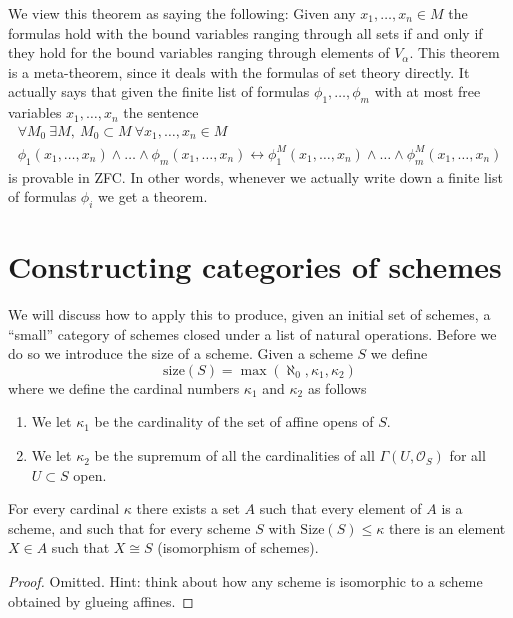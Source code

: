 \noindent
We view this theorem as saying the following: Given any
$x_1, \ldots, x_n \in M$ the formulas hold with the bound variables ranging
through all sets if and only if they hold for the bound variables ranging
through elements of $V_\alpha$. This theorem is a meta-theorem, since
it deals with the formulas of set theory directly.
It actually says that given the finite list of formulas
$\phi_1, \ldots, \phi_m$ with at most free variables $x_1, \ldots, x_n$
the sentence
$$
\begin{matrix}
\forall M_0\ \exists M,\ M_0 \subset M\ \forall x_1, \ldots, x_n \in M \\
\phi_1(x_1,\ldots,x_n) \wedge \ldots \wedge \phi_m(x_1,\ldots,x_n)
\leftrightarrow
\phi_1^M(x_1,\ldots,x_n) \wedge \ldots \wedge \phi_m^M(x_1,\ldots,x_n)
\end{matrix}
$$
is provable in ZFC. In other words, whenever we actually write down
a finite list of formulas $\phi_i$ we get a theorem.

\section{Constructing categories of schemes}
\label{section-fibre-product-schemes}

\noindent
We will discuss how to apply this to produce, given an initial
set of schemes, a ``small'' category of schemes closed under
a list of natural operations. Before we do so we introduce the
size of a scheme. Given a scheme $S$ we define
$$
\text{size}(S) = \max(\aleph_0, \kappa_1, \kappa_2)
$$
where we define the cardinal numbers $\kappa_1$ and $\kappa_2$ as follows
\begin{enumerate}
\item We let $\kappa_1$ be the cardinality of the set of affine opens of $S$.
\item We let $\kappa_2$ be the supremum of all the cardinalities of
all $\Gamma(U, \mathcal{O}_S)$ for all $U \subset S$ open.
\end{enumerate}

\begin{lemma}
\label{lemma-bounded-size}
For every cardinal $\kappa$ there exists a set $A$ such
that every element of $A$ is a scheme, and such that for every
scheme $S$ with $\text{Size}(S) \leq \kappa$ there is
an element $X \in A$ such that $X \cong S$ (isomorphism
of schemes).
\end{lemma}

\begin{proof}
Omitted. Hint: think about how any scheme is isomorphic to a scheme
obtained by glueing affines.
\end{proof}

